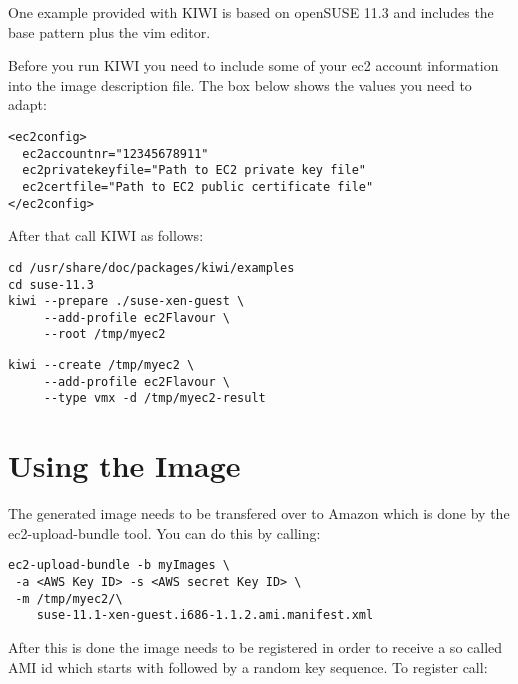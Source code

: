 One example provided with KIWI is based on openSUSE 11.3 and
includes the base pattern plus the vim editor.

Before you run KIWI you need to include some of your ec2 account
information into the image description  file. The box
below shows the values you need to adapt:

\begin{Command}{13cm}
\begin{verbatim}
<ec2config>
  ec2accountnr="12345678911"
  ec2privatekeyfile="Path to EC2 private key file"
  ec2certfile="Path to EC2 public certificate file"
</ec2config>
\end{verbatim}
\end{Command}

After that call KIWI as follows:

\begin{Command}{13cm}
\begin{verbatim}
cd /usr/share/doc/packages/kiwi/examples
cd suse-11.3
kiwi --prepare ./suse-xen-guest \
     --add-profile ec2Flavour \
     --root /tmp/myec2
\end{verbatim}
\end{Command}

\begin{Command}{13cm}
\begin{verbatim}
kiwi --create /tmp/myec2 \
     --add-profile ec2Flavour \
     --type vmx -d /tmp/myec2-result
\end{verbatim}
\end{Command}

\section{Using the Image}
The generated image needs to be transfered over to Amazon which is
done by the ec2-upload-bundle tool. You can do this by calling:

\begin{Command}{13cm}
\begin{verbatim}
ec2-upload-bundle -b myImages \
 -a <AWS Key ID> -s <AWS secret Key ID> \
 -m /tmp/myec2/\
    suse-11.1-xen-guest.i686-1.1.2.ami.manifest.xml
\end{verbatim}
\end{Command}

After this is done the image needs to be registered in order to
receive a so called AMI id which starts with  followed
by a random key sequence. To register call:

